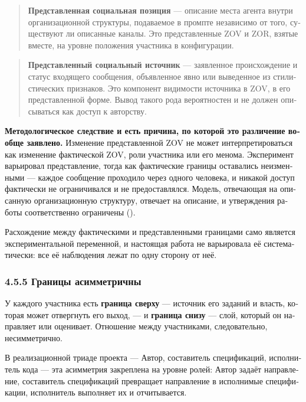 \begin{russian}
\begin{quote}
\textbf{Представленная социальная позиция} — описание места агента внутри организационной структуры, подаваемое в промпте независимо от того, существуют ли описанные каналы. Это представленные ZOV и ZOR, взятые вместе, на уровне положения участника в конфигурации.
\end{quote}
\begin{quote}
\textbf{Представленный социальный источник} — заявленное происхождение и статус входящего сообщения, объявленное явно или выведенное из стилистических признаков. Это компонент видимости источника в ZOV, в его представленной форме. Вывод такого рода вероятностен и не должен описываться как доступ к авторству.
\end{quote}
\textbf{Методологическое следствие и есть причина, по которой это различение вообще заявлено.} Изменение представленной ZOV не может интерпретироваться как изменение фактической ZOV, роли участника или его менома. Эксперимент  варьировал представление, тогда как фактические границы оставались неизменными — каждое сообщение проходило через одного человека, и никакой доступ фактически не ограничивался и не предоставлялся. Модель, отвечающая на описанную организационную структуру, отвечает на описание, и утверждения работы соответственно ограничены ().

Расхождение между фактическими и представленными границами само является экспериментальной переменной, и настоящая работа не варьировала её систематически: все её наблюдения лежат по одну сторону от неё.


\subsubsection*{4.5.5 Границы асимметричны}
\label{sec:ru:4.5.5}

У каждого участника есть \textbf{граница сверху} — источник его заданий и власть, которая может отвергнуть его выход, — и \textbf{граница снизу} — слой, который он направляет или оценивает. Отношение между участниками, следовательно, несимметрично.

В реализационной триаде проекта — Автор, составитель спецификаций, исполнитель кода — эта асимметрия закреплена на уровне ролей: Автор задаёт направление, составитель спецификаций превращает направление в исполнимые спецификации, исполнитель выполняет их и отчитывается.


\end{russian}
